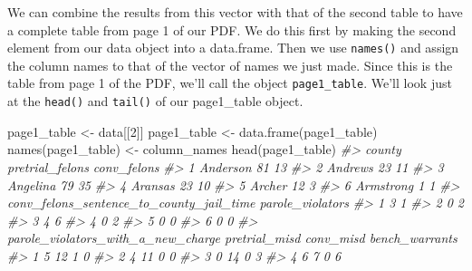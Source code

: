 \documentclass[
]{krantz}
\makeatletter
\newenvironment{Shaded}{\begin{snugshade}}{\end{snugshade}}
\newcommand{\CommentTok}[1]{\textcolor[rgb]{0.37,0.37,0.37}{\textit{#1}}}
\newcommand{\DecValTok}[1]{\textcolor[rgb]{0.06,0.06,0.06}{#1}}
\newcommand{\FunctionTok}[1]{\textcolor[rgb]{0,0,0}{#1}}
\newcommand{\NormalTok}[1]{#1}
\newcommand{\OtherTok}[1]{\textcolor[rgb]{0.37,0.37,0.37}{#1}}
\newenvironment{kframe}{%
\medskip{}
\setlength{\fboxsep}{.8em}
 \def\at@end@of@kframe{}%
 \ifinner\ifhmode%
  \def\at@end@of@kframe{\end{minipage}}%
  \begin{minipage}{\columnwidth}%
 \fi\fi%
 \def\FrameCommand##1{\hskip\@totalleftmargin \hskip-\fboxsep
 \colorbox{shadecolor}{##1}\hskip-\fboxsep
     \hskip-\linewidth \hskip-\@totalleftmargin \hskip\columnwidth}%
 \MakeFramed {\advance\hsize-\width
   \@totalleftmargin\z@ \linewidth\hsize
   \@setminipage}}%
 {\par\unskip\endMakeFramed%
 \at@end@of@kframe}
\renewenvironment{Shaded}{\begin{kframe}}{\end{kframe}}
\makeatother
\begin{document}
We can combine the results from this vector with that of the second table to have a complete table from page 1 of our PDF. We do this first by making the second element from our data object into a data.frame. Then we use \texttt{names()} and assign the column names to that of the vector of names we just made. Since this is the table from page 1 of the PDF, we'll call the object \texttt{page1\_table}. We'll look just at the \texttt{head()} and \texttt{tail()} of our page1\_table object.

\begin{Shaded}
\begin{Highlighting}[]
\NormalTok{page1\_table }\OtherTok{\textless{}{-}}\NormalTok{ data[[}\DecValTok{2}\NormalTok{]]}
\NormalTok{page1\_table }\OtherTok{\textless{}{-}} \FunctionTok{data.frame}\NormalTok{(page1\_table)}
\FunctionTok{names}\NormalTok{(page1\_table) }\OtherTok{\textless{}{-}}\NormalTok{ column\_names}
\FunctionTok{head}\NormalTok{(page1\_table)}
\CommentTok{\#\textgreater{}      county pretrial\_felons conv\_felons}
\CommentTok{\#\textgreater{} 1  Anderson              81          13}
\CommentTok{\#\textgreater{} 2   Andrews              23          11}
\CommentTok{\#\textgreater{} 3  Angelina              79          35}
\CommentTok{\#\textgreater{} 4   Aransas              23          10}
\CommentTok{\#\textgreater{} 5    Archer              12           3}
\CommentTok{\#\textgreater{} 6 Armstrong               1           1}
\CommentTok{\#\textgreater{}   conv\_felons\_sentence\_to\_county\_jail\_time parole\_violators}
\CommentTok{\#\textgreater{} 1                                        3                1}
\CommentTok{\#\textgreater{} 2                                        0                2}
\CommentTok{\#\textgreater{} 3                                        4                6}
\CommentTok{\#\textgreater{} 4                                        0                2}
\CommentTok{\#\textgreater{} 5                                        0                0}
\CommentTok{\#\textgreater{} 6                                        0                0}
\CommentTok{\#\textgreater{}   parole\_violators\_with\_a\_new\_charge pretrial\_misd conv\_misd bench\_warrants}
\CommentTok{\#\textgreater{} 1                                  5            12         1              0}
\CommentTok{\#\textgreater{} 2                                  4            11         0              0}
\CommentTok{\#\textgreater{} 3                                  0            14         0              3}
\CommentTok{\#\textgreater{} 4                                  6             7         0              6}

\end{Highlighting}
\end{Shaded}
\end{document}
